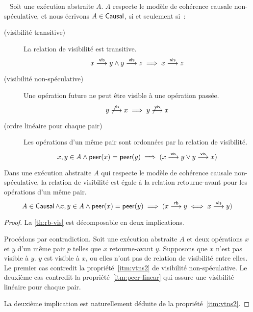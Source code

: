 \clearpage

\begin{definition}\label{def:causal-consistency}~\autocite{mahajan_2011_cac}
  Soit une exécution abstraite $A$. $A$ respecte le modèle de cohérence causale non-spéculative, et nous écrivons $A \in \operatorname{\mathsf{Causal}}$, si et seulement si~:

  \begin{description}
  \item[ (visibilité transitive)]
  La relation de visibilité est transitive.
  \begin{equation*}
    x \overset{\mathsf{vis}}{\longrightarrow} y \land y \overset{\mathsf{vis}}{\longrightarrow} z \implies x \overset{\mathsf{vis}}{\longrightarrow} z
  \end{equation*}

  \item[ (visibilité non-spéculative)]
  Une opération future ne peut être visible à une opération passée.
  \begin{equation*}
    y \not\overset{\mathsf{rb}}{\longrightarrow} x \implies y \not\overset{\mathsf{vis}}{\longrightarrow} x
  \end{equation*}

  \item[ (ordre linéaire pour chaque pair)]
  Les opérations d'un même pair sont ordonnées par la relation de visibilité.
  \begin{equation*}
    x, y \in A \land \operatorname{\mathsf{peer}}(x) = \operatorname{\mathsf{peer}}(y) \implies
    (x \overset{\mathsf{vis}}{\longrightarrow} y \lor y \overset{\mathsf{vis}}{\longrightarrow} x)
  \end{equation*}
  \end{description}
\end{definition}

\begin{proposition}\label{th:rb-vis}
Dans une exécution abstraite $A$ qui respecte le modèle de cohérence causale non-spéculative, la relation de visibilité est égale à la relation retourne-avant pour les opérations d'un même pair.
\begin{equation*}
    A \in \operatorname{\mathsf{Causal}} \land x, y \in A \land \operatorname{\mathsf{peer}}(x) = \operatorname{\mathsf{peer}}(y) \implies (x \overset{\mathsf{rb}}{\longrightarrow} y \iff x \overset{\mathsf{vis}}{\longrightarrow} y)
\end{equation*}
\end{proposition}

\begin{proof}
La \autoref{th:rb-vis} est décomposable en deux implications.

Procédons par contradiction.
Soit une exécution abstraite $A$ et deux opérations $x$ et $y$ d'un même pair $p$ telles que $x$ retourne-avant $y$.
Supposons que $x$ n'est pas visible à $y$.
$y$ est visible à $x$, ou elles n'ont pas de relation de visibilité entre elles.
Le premier cas contredit la propriété~\ref{itm:vtns2} de visibilité non-spéculative.
Le deuxième cas contredit la propriété~\ref{itm:peer-linear} qui assure une visibilité linéaire pour chaque pair.

La deuxième implication est naturellement déduite de la propriété~\ref{itm:vtns2}.
\end{proof}


